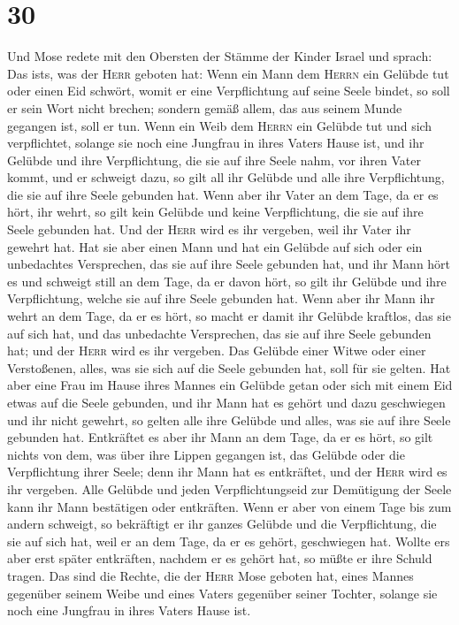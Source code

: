 \hypertarget{section-29}{%
\section{30}\label{section-29}}

 Und Mose redete mit den Obersten der Stämme der Kinder
Israel und sprach: Das ist\textquotesingle s, was der \textsc{Herr}
geboten hat:  Wenn ein Mann dem \textsc{Herrn} ein Gelübde
tut oder einen Eid schwört, womit er eine Verpflichtung auf seine Seele
bindet, so soll er sein Wort nicht brechen; sondern gemäß allem, das aus
seinem Munde gegangen ist, soll er tun.  Wenn ein Weib dem
\textsc{Herrn} ein Gelübde tut und sich verpflichtet, solange sie noch
eine Jungfrau in ihres Vaters Hause ist,  und ihr Gelübde
und ihre Verpflichtung, die sie auf ihre Seele nahm, vor ihren Vater
kommt, und er schweigt dazu, so gilt all ihr Gelübde und alle ihre
Verpflichtung, die sie auf ihre Seele gebunden hat.  Wenn
aber ihr Vater an dem Tage, da er es hört, ihr wehrt, so gilt kein
Gelübde und keine Verpflichtung, die sie auf ihre Seele gebunden hat.
Und der \textsc{Herr} wird es ihr vergeben, weil ihr Vater ihr gewehrt
hat.  Hat sie aber einen Mann und hat ein Gelübde auf sich
oder ein unbedachtes Versprechen, das sie auf ihre Seele gebunden hat,
 und ihr Mann hört es und schweigt still an dem Tage, da
er davon hört, so gilt ihr Gelübde und ihre Verpflichtung, welche sie
auf ihre Seele gebunden hat.  Wenn aber ihr Mann ihr wehrt
an dem Tage, da er es hört, so macht er damit ihr Gelübde kraftlos, das
sie auf sich hat, und das unbedachte Versprechen, das sie auf ihre Seele
gebunden hat; und der \textsc{Herr} wird es ihr vergeben. 
Das Gelübde einer Witwe oder einer Verstoßenen, alles, was sie sich auf
die Seele gebunden hat, soll für sie gelten.  Hat aber
eine Frau im Hause ihres Mannes ein Gelübde getan oder sich mit einem
Eid etwas auf die Seele gebunden,  und ihr Mann hat es
gehört und dazu geschwiegen und ihr nicht gewehrt, so gelten alle ihre
Gelübde und alles, was sie auf ihre Seele gebunden hat. 
Entkräftet es aber ihr Mann an dem Tage, da er es hört, so gilt nichts
von dem, was über ihre Lippen gegangen ist, das Gelübde oder die
Verpflichtung ihrer Seele; denn ihr Mann hat es entkräftet, und der
\textsc{Herr} wird es ihr vergeben.  Alle Gelübde und
jeden Verpflichtungseid zur Demütigung der Seele kann ihr Mann
bestätigen oder entkräften.  Wenn er aber von einem Tage
bis zum andern schweigt, so bekräftigt er ihr ganzes Gelübde und die
Verpflichtung, die sie auf sich hat, weil er an dem Tage, da er es
gehört, geschwiegen hat.  Wollte er\textquotesingle s
aber erst später entkräften, nachdem er es gehört hat, so müßte er ihre
Schuld tragen.  Das sind die Rechte, die der
\textsc{Herr} Mose geboten hat, eines Mannes gegenüber seinem Weibe und
eines Vaters gegenüber seiner Tochter, solange sie noch eine Jungfrau in
ihres Vaters Hause ist.


